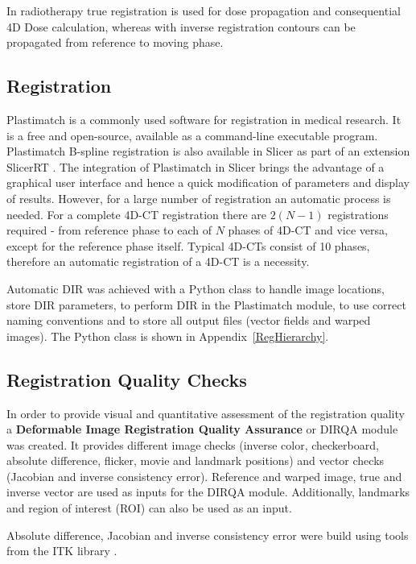 \documentclass[type=dr, dr=rernat, accentcolor=tud7b,colorbacktitle, bigchapter, openright, twoside, 12pt ]{tudthesis}
\begin{document}
In radiotherapy true registration is used for dose propagation and consequential 4D Dose calculation, whereas with inverse registration contours can be propagated from reference to moving phase.

\subsection{Registration}
\label{RegistrationImplement}

Plastimatch \cite{Shackleford2010} is a commonly used software for registration in medical research. It is a free and open-source, available as a command-line executable program. 
Plastimatch B-spline registration is also available in Slicer as part of an extension SlicerRT \cite{Pinter2012}.
The integration of Plastimatch in Slicer brings the advantage of a graphical user interface and hence a quick modification of parameters and display of results. 
However, for a large number of registration an automatic process is needed. For a complete 4D-CT registration there are $2(N-1)$ registrations required - from reference phase to each of $N$ phases of 4D-CT and vice versa, except for the reference phase itself. 
Typical 4D-CTs consist of 10 phases, therefore an automatic registration of a 4D-CT is a necessity.

Automatic DIR was achieved with a Python class to handle image locations, store DIR parameters, to perform DIR in the Plastimatch module, to use correct naming conventions and to store all output files (vector fields and warped images). 
The Python class is shown in Appendix~\ref{RegHierarchy}.


\subsection{Registration Quality Checks}
\label{DIRQA}

In order to provide visual and quantitative assessment of the registration quality a \textbf{Deformable Image Registration Quality Assurance} or DIRQA module was created. It provides different image checks (inverse color, checkerboard, absolute difference, flicker, movie and landmark positions) and vector checks (Jacobian and inverse consistency error). Reference and warped image, true and inverse vector are used as inputs for the DIRQA module. Additionally, landmarks and region of interest (ROI) can also be used as an input.

Absolute difference, Jacobian and inverse consistency error were build using tools from the ITK library \cite{Yoo2002}.
\end{document}
